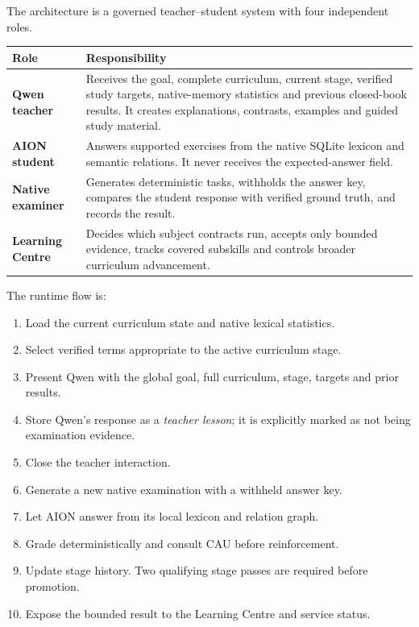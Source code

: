 \documentclass[11pt,a4paper]{article}
\begin{document}
The architecture is a governed teacher--student system with four independent roles.

\begin{center}
\begin{tabularx}{\textwidth}{>{\bfseries}p{} X}
\toprule
Role & Responsibility \\
\midrule
Qwen teacher & Receives the goal, complete curriculum, current stage, verified study targets,
native-memory statistics and previous closed-book results. It creates explanations,
contrasts, examples and guided study material. \\
AION student & Answers supported exercises from the native SQLite lexicon and semantic
relations. It never receives the expected-answer field. \\
Native examiner & Generates deterministic tasks, withholds the answer key, compares the
student response with verified ground truth, and records the result. \\
Learning Centre & Decides which subject contracts run, accepts only bounded evidence,
tracks covered subskills and controls broader curriculum advancement. \\
\bottomrule
\end{tabularx}
\end{center}

The runtime flow is:

\begin{enumerate}
  \item Load the current curriculum state and native lexical statistics.
  \item Select verified terms appropriate to the active curriculum stage.
  \item Present Qwen with the global goal, full curriculum, stage, targets and prior results.
  \item Store Qwen's response as a \emph{teacher lesson}; it is explicitly marked as not being
        examination evidence.
  \item Close the teacher interaction.
  \item Generate a new native examination with a withheld answer key.
  \item Let AION answer from its local lexicon and relation graph.
  \item Grade deterministically and consult CAU before reinforcement.
  \item Update stage history. Two qualifying stage passes are required before promotion.
  \item Expose the bounded result to the Learning Centre and service status.
\end{enumerate}
\end{document}

